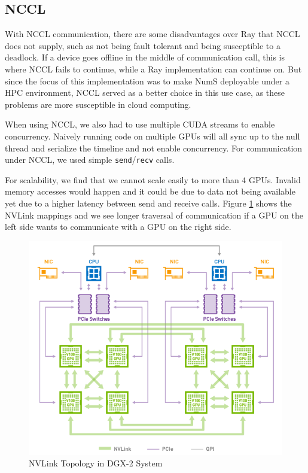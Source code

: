 \documentclass{article}
\begin{document}
\subsection{NCCL}
With NCCL communication, there are some disadvantages over Ray that NCCL does not supply, such as not being fault tolerant and being susceptible to a deadlock. If a device goes offline in the middle of communication call, this is where NCCL fails to continue, while a Ray implementation can continue on. But since the focus of this implementation was to make NumS deployable under a HPC environment, NCCL served as a better choice in this use case, as these problems are more susceptible in cloud computing. 

When using NCCL, we also had to use multiple CUDA streams to enable concurrency. Naively running code on multiple GPUs will all sync up to the null thread and serialize the timeline and not enable concurrency. For communication under NCCL, we used simple \verb|send|/\verb|recv| calls.

For scalability, we find that we cannot scale easily to more than 4 GPUs. Invalid memory accesses would happen and it could be due to data not being available yet due to a higher latency between send and receive calls. Figure \ref{fig:nvlink} shows the NVLink mappings and we see longer traversal of communication if a GPU on the left side wants to communicate with a GPU on the right side. 

\begin{figure}
  \centerline{\includegraphics[width=5in]{figures/nvlink.png}}
  \caption{NVLink Topology in DGX-2 System}
  \label{fig:nvlink}
\end{figure}
\end{document}
